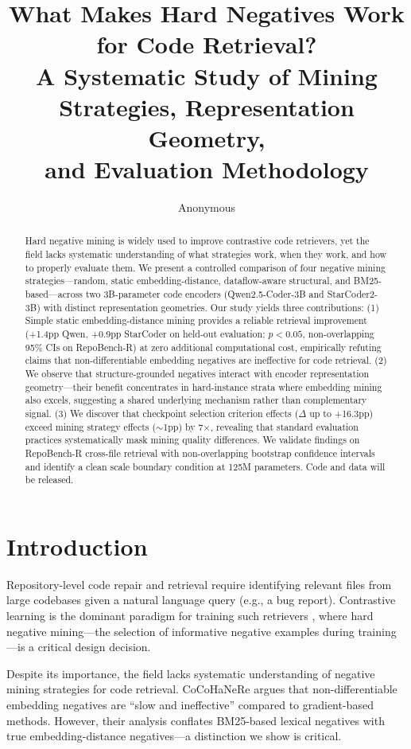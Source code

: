 \documentclass[11pt,a4paper]{article}
\title{What Makes Hard Negatives Work for Code Retrieval?\\A Systematic Study of Mining Strategies, Representation Geometry,\\and Evaluation Methodology}
\author{Anonymous}
\begin{document}
\maketitle

\begin{abstract}
Hard negative mining is widely used to improve contrastive code retrievers, yet the field lacks systematic understanding of what strategies work, when they work, and how to properly evaluate them. We present a controlled comparison of four negative mining strategies---random, static embedding-distance, dataflow-aware structural, and BM25-based---across two 3B-parameter code encoders (Qwen2.5-Coder-3B and StarCoder2-3B) with distinct representation geometries. Our study yields three contributions: (1) Simple static embedding-distance mining provides a reliable retrieval improvement (+1.4pp Qwen, +0.9pp StarCoder on held-out evaluation; $p < 0.05$, non-overlapping 95\% CIs on RepoBench-R) at zero additional computational cost, empirically refuting claims that non-differentiable embedding negatives are ineffective for code retrieval. (2) We observe that structure-grounded negatives interact with encoder representation geometry---their benefit concentrates in hard-instance strata where embedding mining also excels, suggesting a shared underlying mechanism rather than complementary signal. (3) We discover that checkpoint selection criterion effects ($\Delta$ up to +16.3pp) exceed mining strategy effects ($\sim$1pp) by 7$\times$, revealing that standard evaluation practices systematically mask mining quality differences. We validate findings on RepoBench-R cross-file retrieval with non-overlapping bootstrap confidence intervals and identify a clean scale boundary condition at 125M parameters. Code and data will be released.
\end{abstract}

\section{Introduction}

Repository-level code repair and retrieval require identifying relevant files from large codebases given a natural language query (e.g., a bug report). Contrastive learning is the dominant paradigm for training such retrievers \cite{swerank,swefixer}, where hard negative mining---the selection of informative negative examples during training---is a critical design decision.

Despite its importance, the field lacks systematic understanding of negative mining strategies for code retrieval. CoCoHaNeRe \cite{cocohanere} argues that non-differentiable embedding negatives are ``slow and ineffective'' compared to gradient-based methods. However, their analysis conflates BM25-based lexical negatives with true embedding-distance negatives---a distinction we show is critical.
\end{document}
